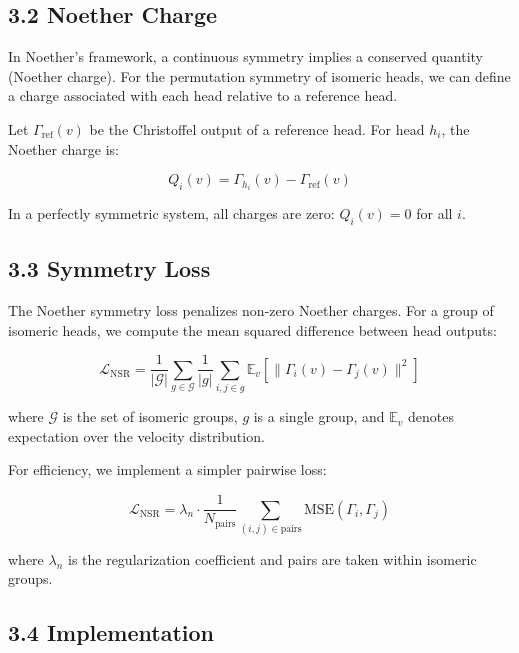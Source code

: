 \documentclass[12pt]{article}
\begin{document}
\subsection{3.2 Noether Charge}

In Noether's framework, a continuous symmetry implies a conserved quantity (Noether charge). For the permutation symmetry of isomeric heads, we can define a charge associated with each head relative to a reference head.

Let $\Gamma_{\text{ref}}(v)$ be the Christoffel output of a reference head. For head $h_i$, the Noether charge is:

\begin{equation}
Q_i(v) = \Gamma_{h_i}(v) - \Gamma_{\text{ref}}(v)
\end{equation}

In a perfectly symmetric system, all charges are zero: $Q_i(v) = 0$ for all $i$.

\subsection{3.3 Symmetry Loss}

The Noether symmetry loss penalizes non-zero Noether charges. For a group of isomeric heads, we compute the mean squared difference between head outputs:

\begin{equation}
\mathcal{L}_{\text{NSR}} = \frac{1}{|\mathcal{G}|} \sum_{g \in \mathcal{G}} \frac{1}{|g|} \sum_{i,j \in g} \mathbb{E}_v \left[ \|\Gamma_i(v) - \Gamma_j(v)\|^2 \right]
\end{equation}

where $\mathcal{G}$ is the set of isomeric groups, $g$ is a single group, and $\mathbb{E}_v$ denotes expectation over the velocity distribution.

For efficiency, we implement a simpler pairwise loss:

\begin{equation}
\mathcal{L}_{\text{NSR}} = \lambda_n \cdot \frac{1}{N_{\text{pairs}}} \sum_{(i,j) \in \text{pairs}} \text{MSE}(\Gamma_i, \Gamma_j)
\end{equation}

where $\lambda_n$ is the regularization coefficient and pairs are taken within isomeric groups.

\subsection{3.4 Implementation}
\end{document}
